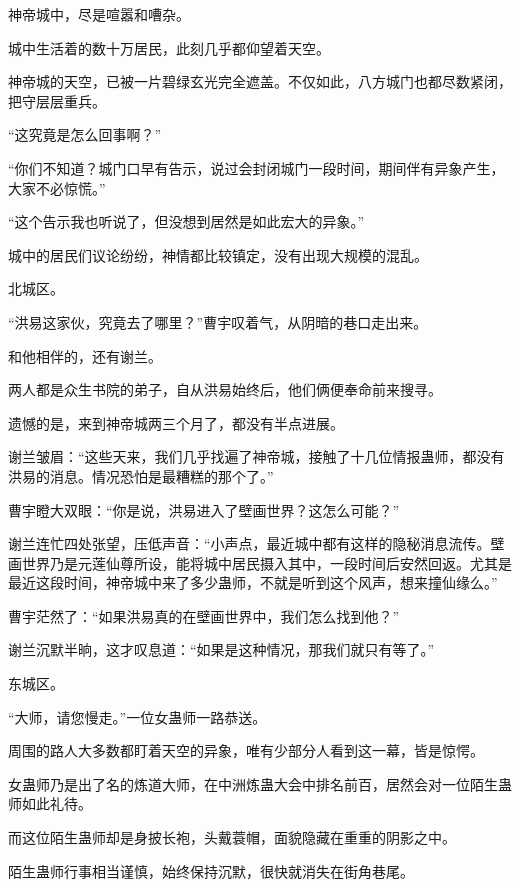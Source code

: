 
\begin{this_body}

神帝城中，尽是喧嚣和嘈杂。

城中生活着的数十万居民，此刻几乎都仰望着天空。

神帝城的天空，已被一片碧绿玄光完全遮盖。不仅如此，八方城门也都尽数紧闭，把守层层重兵。

“这究竟是怎么回事啊？”

“你们不知道？城门口早有告示，说过会封闭城门一段时间，期间伴有异象产生，大家不必惊慌。”

“这个告示我也听说了，但没想到居然是如此宏大的异象。”

城中的居民们议论纷纷，神情都比较镇定，没有出现大规模的混乱。

北城区。

“洪易这家伙，究竟去了哪里？”曹宇叹着气，从阴暗的巷口走出来。

和他相伴的，还有谢兰。

两人都是众生书院的弟子，自从洪易始终后，他们俩便奉命前来搜寻。

遗憾的是，来到神帝城两三个月了，都没有半点进展。

谢兰皱眉：“这些天来，我们几乎找遍了神帝城，接触了十几位情报蛊师，都没有洪易的消息。情况恐怕是最糟糕的那个了。”

曹宇瞪大双眼：“你是说，洪易进入了壁画世界？这怎么可能？”

谢兰连忙四处张望，压低声音：“小声点，最近城中都有这样的隐秘消息流传。壁画世界乃是元莲仙尊所设，能将城中居民摄入其中，一段时间后安然回返。尤其是最近这段时间，神帝城中来了多少蛊师，不就是听到这个风声，想来撞仙缘么。”

曹宇茫然了：“如果洪易真的在壁画世界中，我们怎么找到他？”

谢兰沉默半晌，这才叹息道：“如果是这种情况，那我们就只有等了。”

东城区。

“大师，请您慢走。”一位女蛊师一路恭送。

周围的路人大多数都盯着天空的异象，唯有少部分人看到这一幕，皆是惊愕。

女蛊师乃是出了名的炼道大师，在中洲炼蛊大会中排名前百，居然会对一位陌生蛊师如此礼待。

而这位陌生蛊师却是身披长袍，头戴蓑帽，面貌隐藏在重重的阴影之中。

陌生蛊师行事相当谨慎，始终保持沉默，很快就消失在街角巷尾。


\end{this_body}
